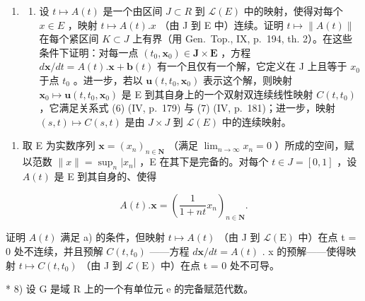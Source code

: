 \begin{enumerate}
\def\labelenumi{\arabic{enumi})}
\setcounter{enumi}{6}
\tightlist
\item
  \begin{enumerate}
  \def\labelenumii{\alph{enumii})}
  \tightlist
  \item
    设 \(t \mapsto A(t)\) 是一个由区间 \(J \subset R\) 到 \(\mathcal{L}(E)\) 中的映射，使得对每个 \(x \in E\) ，映射 \(t \mapsto A(t).x\) （由 J 到 E 中）连续。证明 \(t \mapsto \|A(t)\|\) 在每个紧区间 \(K \subset J\) 上有界（用 Gen.~Top., IX, p.~194, th. 2）。在这些条件下证明：对每一点 \((t_{0}, \mathbf{x}_{0}) \in \mathbf{J} \times \mathbf{E}\) ，方程 \(d\mathbf{x}/dt = A(t).\mathbf{x} + \mathbf{b}(t)\) 有一个且仅有一个解，它定义在 J 上且等于 \(x_{0}\) 于点 \(t_{0}\) 。进一步，若以 \(\mathbf{u}(t, t_{0}, \mathbf{x}_{0})\) 表示这个解，则映射 \(\mathbf{x}_{0} \mapsto \mathbf{u}(t, t_{0}, \mathbf{x}_{0})\) 是 E 到其自身上的一个双射双连续线性映射 \(C(t, t_{0})\) ，它满足关系式 (6) (IV, p.~179) 与 (7) (IV, p.~181)；进一步，映射 \((s, t) \mapsto C(s, t)\) 是由 \(J \times J\) 到 \(\mathcal{L}(E)\) 中的连续映射。
  \end{enumerate}
\end{enumerate}

\begin{enumerate}
\def\labelenumi{\alph{enumi})}
\setcounter{enumi}{1}
\tightlist
\item
  取 E 为实数序列 \(\mathbf{x}=(x_{n})_{n\in\mathbf{N}}\) （满足 \(\lim_{n\to\infty}x_{n}=0\) ）所成的空间，赋以范数 \(\|x\|=\sup_{n}|x_{n}|\) ，E 在其下是完备的。对每个 \(t\in J=[0,1]\) ，设 \(A(t)\) 是 E 到其自身的、使得
\end{enumerate}

\[
A (t). \mathbf {x} = \left(\frac {1}{1 + n t} x _ {n}\right) _ {n \in \mathbf {N}}.
\]

证明 \(A(t)\) 满足 a) 的条件，但映射 \(t \mapsto A(t)\) （由 J 到 \(\mathcal{L}(\mathrm{E})\) 中）在点 t = 0 处不连续，并且预解 \(C(t, t_0)\) ——方程 \(d\mathbf{x}/dt = A(t)\) . x 的预解——使得映射 \(t \mapsto C(t, t_0)\) （由 J 到 \(\mathcal{L}(\mathrm{E})\) 中）在点 t = 0 处不可导。

* 8) 设 G 是域 R 上的一个有单位元 e 的完备赋范代数。

